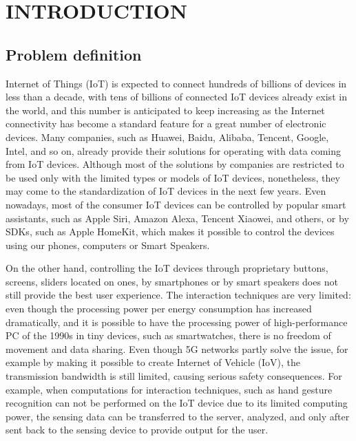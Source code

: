 
\chapter{INTRODUCTION}

\section{Problem definition}

Internet of Things (IoT) is expected to connect hundreds of billions of devices in less than a decade\cite{simiscuka_synchronisation_2018}, with tens of billions of connected IoT devices already exist in the world, and this number is anticipated to keep increasing as the Internet connectivity has become a standard feature for a great number of electronic devices\cite{hu_virtual_2021}. Many companies, such as Huawei, Baidu, Alibaba, Tencent, Google, Intel, and so on, already provide their solutions for operating with data coming from IoT devices. Although most of the solutions by companies are restricted to be used only with the limited types or models of IoT devices, nonetheless, they may come to the standardization of IoT devices in the next few years. Even nowadays, most of the consumer IoT devices can be controlled by popular smart assistants, such as Apple Siri, Amazon Alexa, Tencent Xiaowei, and others, or by SDKs, such as Apple HomeKit, which makes it possible to control the devices using our phones, computers or Smart Speakers.

On the other hand, controlling the IoT devices through proprietary buttons, screens, sliders located on ones, by smartphones or by smart speakers does not still provide the best user experience. The interaction techniques are very limited: even though the processing power per energy consumption has increased dramatically, and it is possible to have the processing power of high-performance PC of the 1990s in tiny devices, such as smartwatches, there is no freedom of movement and data sharing. Even though 5G networks partly solve the issue, for example by making it possible to create Internet of Vehicle (IoV), the transmission bandwidth is still limited, causing serious safety consequences\cite{hu_virtual_2021}. For example, when computations for interaction techniques, such as hand gesture recognition can not be performed on the IoT device due to its limited computing power, the sensing data can be transferred to the server, analyzed, and only after sent back to the sensing device to provide output for the user.

